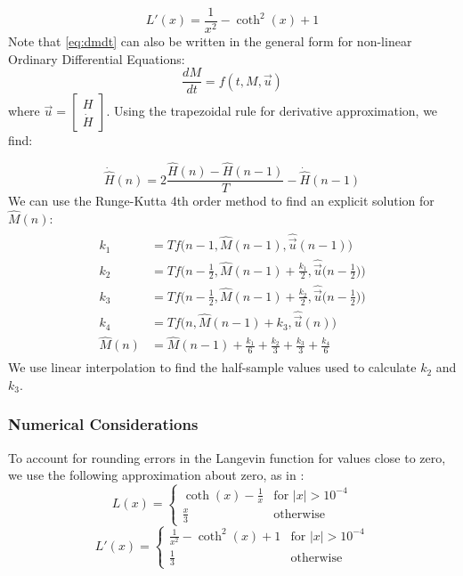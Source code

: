 \documentclass[twoside,a4paper]{article}
\begin{document}
\begin{equation}
    L'(x) = \frac{1}{x^2} - \coth^2(x) + 1
\end{equation}
%
Note that \cref{eq:dmdt} can also be written in the general form for non-linear
Ordinary Differential Equations:
\begin{equation}
    \frac{dM}{dt} = f(t,M,\vec{u})
\end{equation}
where $\vec{u} = \begin{bmatrix}
    H \\
    \dot{H}
    \end{bmatrix}$.
\newline\newline
Using the trapezoidal rule for derivative approximation, we find:

\begin{equation}
    \dot{\hat{H}}(n) = 2\frac{\hat{H}(n) - \hat{H}(n-1)}{T} - \dot{\hat{H}}(n-1)
    \label{eq:hDeriv}
\end{equation}
%
We can use the Runge-Kutta 4th order method \cite{Yeh} to find an explicit solution
for $\hat{M}(n)$:
\begin{align}
\begin{split}
    k_1 &= T f \Big(n-1, \hat{M}(n-1), \hat{\vec{u}}(n-1) \Big)\\
    k_2 &= T f \Big(n - \frac{1}{2}, \hat{M}(n-1) + \frac{k_1}{2}, \hat{\vec{u}}  \Big(n-\frac{1}{2} \Big) \Big)\\
    k_3 &= T f \Big(n- \frac{1}{2}, \hat{M}(n-1) + \frac{k_2}{2}, \hat{\vec{u}} \Big(n-\frac{1}{2} \Big) \Big)\\
    k_4 &= T f \Big(n, \hat{M}(n-1) + k_3, \hat{\vec{u}}(n) \Big)\\
    \hat{M}(n) &= \hat{M}(n-1) + \frac{k_1}{6} + \frac{k_2}{3} + \frac{k_3}{3} + \frac{k_4}{6}
\end{split}
\end{align}
%
We use linear interpolation to find the half-sample values used to calculate $k_2$ and $k_3$.

\subsubsection{Numerical Considerations}
To account for rounding errors in the Langevin function for values close to 
zero, we use the following approximation about zero, as in \cite{Hysteresis}:
\begin{equation}
    L(x) = \begin{cases}
        \coth(x) - \frac{1}{x} & \text{for $|x| > 10^{-4}$} \\
        \frac{x}{3} & \text{otherwise}
    \end{cases}
\end{equation}
\begin{equation}
    L'(x) = \begin{cases}
        \frac{1}{x^2} - \coth^{2}(x) + 1 & \text{for $|x| > 10^{-4}$} \\
        \frac{1}{3} & \text{otherwise}
    \end{cases}
\end{equation}
\end{document}
